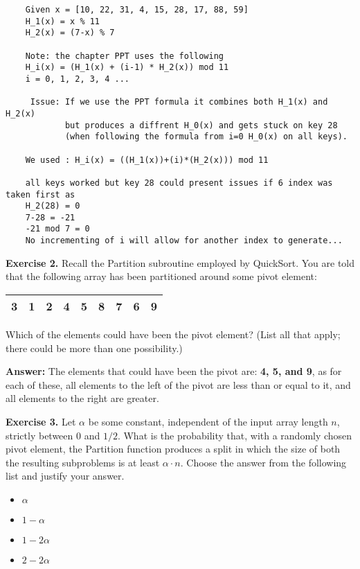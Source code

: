 \documentclass[11pt]{article}
\begin{document}
\bigskip
\begin{verbatim}
    Given x = [10, 22, 31, 4, 15, 28, 17, 88, 59]
    H_1(x) = x % 11
    H_2(x) = (7-x) % 7
    
    Note: the chapter PPT uses the following
    H_i(x) = (H_1(x) + (i-1) * H_2(x)) mod 11
    i = 0, 1, 2, 3, 4 ...

     Issue: If we use the PPT formula it combines both H_1(x) and H_2(x) 
            but produces a diffrent H_0(x) and gets stuck on key 28
            (when following the formula from i=0 H_0(x) on all keys).

    We used : H_i(x) = ((H_1(x))+(i)*(H_2(x))) mod 11

    all keys worked but key 28 could present issues if 6 index was taken first as 
    H_2(28) = 0
    7-28 = -21 
    -21 mod 7 = 0
    No incrementing of i will allow for another index to generate...
\end{verbatim}





\textbf{Exercise 2.}  Recall the \textsf{Partition} subroutine employed by \textsf{QuickSort}. You are told that the following array has been partitioned around some pivot element:
\medskip

\begin{tabular}{|c|c|c|c|c|c|c|c|c|}
\hline 
3 & 1& 2 & 4 &5 &8 & 7 & 6 & 9 \\
\hline
\end{tabular}
\medskip

Which of the elements could have been the pivot element? (List all that apply; there could be more than one possibility.)
\medskip

\textbf{Answer:} The elements that could have been the pivot are: \textbf{4, 5, and 9}, as for each of these, all elements to the left of the pivot are less than or equal to it, and all elements to the right are greater.
\bigskip


\textbf{Exercise 3.}
Let $\alpha$ be some constant, independent of the input array length $n$, strictly between $0$ and $1/2$. What is the probability that, with a randomly chosen pivot element, the \textsf{Partition} function produces a split in which the size of both the resulting subproblems is at least $\alpha \cdot n$. Choose the answer from the following list and justify your answer.
\begin{itemize}
\item $\alpha$
\item $1 - \alpha$
\item $1-2\alpha$
\item $2 - 2 \alpha$
\end{itemize}
\medskip
\end{document}
